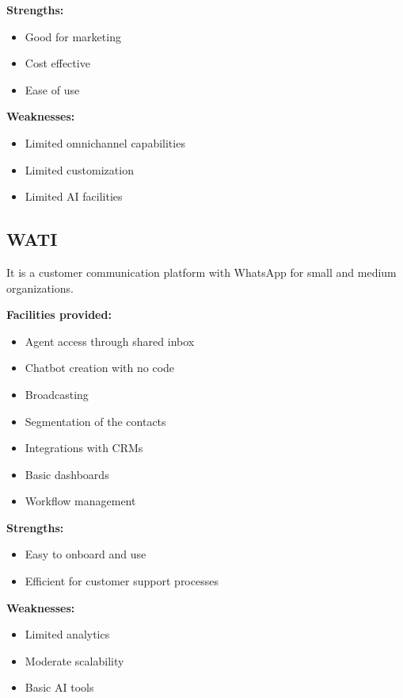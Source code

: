 \textbf{Strengths:}
\begin{itemize}
    \item Good for marketing
    \item Cost effective
    \item Ease of use
\end{itemize}

\textbf{Weaknesses:}
\begin{itemize}
    \item Limited omnichannel capabilities
    \item Limited customization
    \item Limited AI facilities
\end{itemize}


\subsection{WATI}

It is a customer communication platform with WhatsApp for small and medium organizations.

\textbf{Facilities provided:}
\begin{itemize}
    \item Agent access through shared inbox
    \item Chatbot creation with no code
    \item Broadcasting
    \item Segmentation of the contacts
    \item Integrations with CRMs
    \item Basic dashboards
    \item Workflow management
\end{itemize}

\textbf{Strengths:}
\begin{itemize}
    \item Easy to onboard and use
    \item Efficient for customer support processes
\end{itemize}

\textbf{Weaknesses:}
\begin{itemize}
    \item Limited analytics
    \item Moderate scalability
    \item Basic AI tools
\end{itemize}

